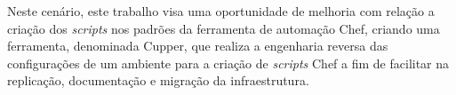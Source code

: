 Neste cenário, este trabalho visa uma oportunidade de melhoria com relação
a criação dos \textit{scripts} nos padrões da ferramenta de automação Chef, criando uma
ferramenta, denominada Cupper, que realiza a engenharia reversa das configurações
de um ambiente para a criação de \textit{scripts} Chef a fim de facilitar na replicação,
documentação e migração da infraestrutura.

